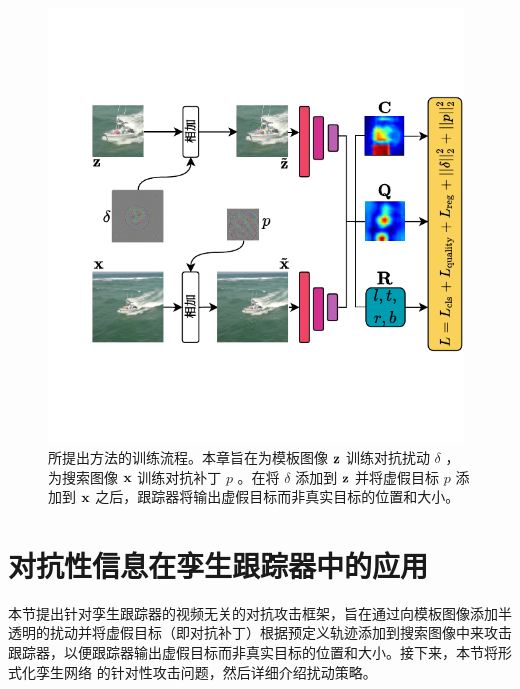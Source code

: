 \begin{figure}[t]
\centering
\includegraphics[width=0.98\textwidth]{Img/attack/network_v6.pdf}
\caption{所提出方法的训练流程。本章旨在为模板图像 $\textbf z$ 训练对抗扰动 $\delta$ ，为搜索图像 $\textbf x$ 训练对抗补丁 $p$ 。在将 $\delta$ 添加到 $\textbf z$ 并将虚假目标 $p$ 添加到 $\textbf x$ 之后，跟踪器将输出虚假目标而非真实目标的位置和大小。}
\label{fig:net}
\end{figure}

\section{对抗性信息在孪生跟踪器中的应用}
本节提出针对孪生跟踪器的视频无关的对抗攻击框架，旨在通过向模板图像添加半透明的扰动并将虚假目标（即对抗补丁）根据预定义轨迹添加到搜索图像中来攻击跟踪器，以便跟踪器输出虚假目标而非真实目标的位置和大小。接下来，本节将形式化孪生网络 \cite{SiamFC++} 的针对性攻击问题，然后详细介绍扰动策略。

